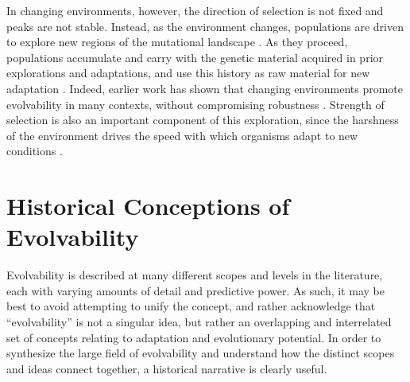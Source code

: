 \documentclass[PhD]{msu-thesis}
\begin{document}
In changing environments, however, the direction of selection is not fixed and peaks are not stable.  Instead, as the environment changes, populations are driven to explore new regions of the mutational landscape \cite{kashtan_varying_2007,connelly_negative_2015}. As they proceed, populations accumulate and carry with the genetic material acquired in prior explorations and adaptations, and use this history as raw material for new adaptation \cite{mcclintock_significance_1993}. Indeed, earlier work has shown that changing environments promote evolvability in many contexts, without compromising robustness \cite{crombach_evolution_2008,wilke_evolution_2001}. Strength of selection is also an important component of this exploration, since the harshness of the environment drives the speed with which organisms adapt to new conditions \cite{goddard_sex_2005}.


\section{Historical Conceptions of Evolvability}
Evolvability is described at many different scopes and levels in the literature, each with varying amounts of detail and predictive power. As such, it may be best to avoid attempting to unify the concept, and rather acknowledge that “evolvability” is not a singular idea, but rather an overlapping and interrelated set of concepts relating to adaptation and evolutionary potential. In order to synthesize the large field of evolvability and understand how the distinct scopes and ideas connect together, a historical narrative is clearly useful.
\end{document}
